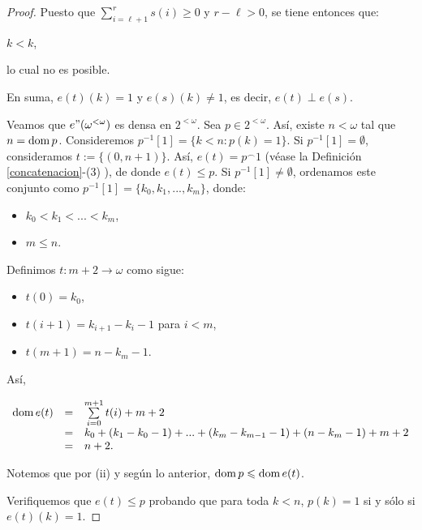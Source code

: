 \documentclass[11pt]{unam_tesis1}
\theoremstyle{MyThmStyle}
\theoremstyle{definition}
\theoremstyle{plain}
\theoremstyle{remark}
\def\dom{\mathop{\rm dom}\nolimits}
\let\leq\leqslant
\let\geq\geqslant
\begin{document}
\begin{proof}
Puesto que $\sum\limits_{i=\ell+1}^{r}s(i)\geq 0$ y $r-\ell>0$, se tiene entonces que:

\begin{center}

$k<k$,

\end{center}

lo cual no es posible.

En suma, $e(t)(k)=1$ y $e(s)(k)\neq 1$, es decir, $e(t)\perp e(s)$.

Veamos que $e"(\omega^{<\omega})$ es densa en $2^{<\omega}$. Sea $p\in 2^{<\omega}$. As\'i, existe $n< \omega$ tal que $n=\dom p$. Consideremos $p^{-1}[1]=\{k<n:p(k)=1 \}$. Si $p^{-1}[1]=\emptyset$, consideramos $t := \{ (0,n+1) \}$. As\'i, $e(t)=p^{\frown} 1$ (v\'ease la Definici\'on \ref{concatenacion}-(3) ), de donde $e(t)\leq p$. Si $p^{-1}[1]\neq \emptyset$, ordenamos este conjunto como $p^{-1}[1]=\{k_0, k_1,...,k_m \}$, donde:

\begin{itemize}

\item [(i)] $k_0<k_1<...<k_m$,
\item [(ii)] $m\leq n$.

\end{itemize}

Definimos $t:m+2\to\omega$ como sigue:

\begin{itemize}

\item $t(0)=k_0$,
\item $t(i+1)=k_{i+1}-k_i-1$ para $i< m$,
\item $t(m+1)=n-k_m-1$.

\end{itemize}

As\'i,

\begin{center}
$\begin{array} {lcl} \dom e(t) & = & \sum\limits_{i=0}^{m+1}t(i)+m+2  \\ & = & k_0+(k_1-k_0-1)+...+(k_m-k_{m-1}-1)+(n-k_m-1)+m+2 \\ & = & n+2. \end{array}$
\end{center}

Notemos que por (ii) y seg\'un lo anterior, $\dom p\leq \dom e(t)$.

Verifiquemos que $e(t)\leq p$ probando que para toda $k<n$, $p(k)=1$ si y s\'olo si $e(t)(k)=1$.


\end{proof}
\end{document}
